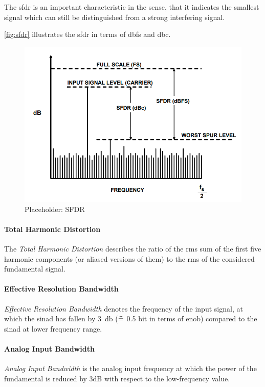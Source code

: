 The \gls{sfdr} is an important characteristic in the sense, that it indicates the smallest signal which can still be distinguished from a strong interfering signal. \cite{walt2009} 

\autoref{fig:sfdr} illustrates the \gls{sfdr} in terms of \gls{dbfs} and \gls{dbc}.

\begin{figure}[tbh]
	\centering
	\includegraphics[width = \textwidth]{chap/02-theory/img/sfdr}
	\caption{Placeholder: SFDR \cite{walt2009}}
	\label{fig:sfdr}
\end{figure}

\paragraph{Total Harmonic Distortion}
The \textit{Total Harmonic Distortion} describes the ratio of the \gls{rms} sum of the first five harmonic components (or aliased versions of them) to the \gls{rms} of the considered fundamental signal.  \cite{Lundberg}

\paragraph{Effective Resolution Bandwidth}
\textit{Effective Resolution Bandwidth} denotes the frequency of the input signal, at which the \gls{sinad} has fallen by \SI{3}{\decibel} ($\mathrel{\widehat{=}}$ 0.5 bit in terms of \gls{enob}) compared to the \gls{sinad} at lower frequency range. \cite{Lundberg}

\paragraph{Analog Input Bandwidth}
\textit{Analog Input Bandwidth} is the analog input frequency at which the power of the fundamental is reduced by 3dB with respect to the low-frequency value.

